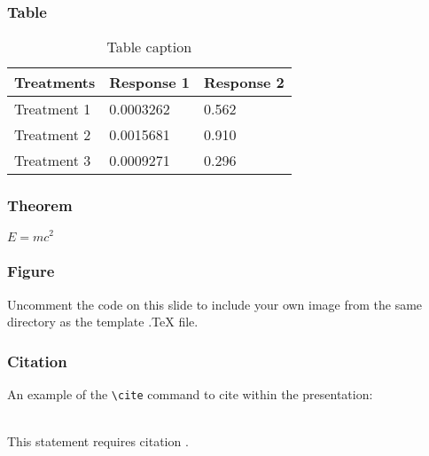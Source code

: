 \documentclass[aspectratio=169,xcolor=dvipsnames]{beamer}
\begin{document}
\begin{frame}
    \frametitle{Table}
    \begin{table}
        \begin{tabular}{l l l}
            \toprule
            \textbf{Treatments} & \textbf{Response 1} & \textbf{Response 2} \\
            \midrule
            Treatment 1         & 0.0003262           & 0.562               \\
            Treatment 2         & 0.0015681           & 0.910               \\
            Treatment 3         & 0.0009271           & 0.296               \\
            \bottomrule
        \end{tabular}
        \caption{Table caption}
    \end{table}
\end{frame}


\begin{frame}
    \frametitle{Theorem}
    \begin{theorem}
        $E = mc^2$
    \end{theorem}
\end{frame}


\begin{frame}
    \frametitle{Figure}
    Uncomment the code on this slide to include your own image from the same directory as the template .TeX file.
\end{frame}


\begin{frame}[fragile] %
    \frametitle{Citation}
    An example of the \verb|\cite| command to cite within the presentation:\\~

    This statement requires citation \cite{p1}.
\end{frame}

\end{document}
